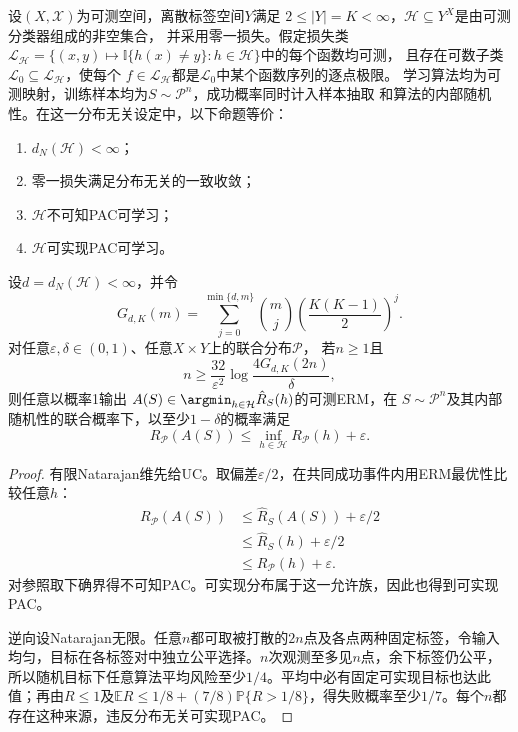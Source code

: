 \begin{theorem}[有限标签的可学习性刻画]
\label{thm:finite-label-learnability}
设$(X,\mathcal X)$为可测空间，离散标签空间$Y$满足
$2\leq|Y|=K<\infty$，$\mathcal H\subseteq Y^X$是由可测分类器组成的非空集合，
并采用零一损失。假定损失类
$\mathcal L_{\mathcal H}
=\{(x,y)\mapsto\mathbb I\{h(x)\neq y\}:h\in\mathcal H\}$中的每个函数均可测，
且存在可数子类$\mathcal L_0\subseteq\mathcal L_{\mathcal H}$，使每个
$f\in\mathcal L_{\mathcal H}$都是$\mathcal L_0$中某个函数序列的逐点极限。
学习算法均为可测映射，训练样本均为$S\sim\mathcal P^n$，成功概率同时计入样本抽取
和算法的内部随机性。在这一分布无关设定中，以下命题等价：
\begin{enumerate}
 \item $d_N(\mathcal H)<\infty$；
 \item 零一损失满足分布无关的一致收敛；
 \item $\mathcal H$不可知PAC可学习；
 \item $\mathcal H$可实现PAC可学习。
\end{enumerate}

设$d=d_N(\mathcal H)<\infty$，并令
\[
 G_{d,K}(m)=\sum_{j=0}^{\min\{d,m\}}\binom mj
 \left(\frac{K(K-1)}2\right)^j.
\]
对任意$\varepsilon,\delta\in(0,1)$、任意$X\times Y$上的联合分布$\mathcal P$，
若$n\geq1$且
\[
 n\geq\frac{32}{\varepsilon^2}\log\frac{4G_{d,K}(2n)}{\delta},
\]
则任意以概率1输出
$A(S)\in\argmin_{h\in\mathcal H}\hat R_S(h)$的可测ERM，在
$S\sim\mathcal P^n$及其内部随机性的联合概率下，以至少$1-\delta$的概率满足
\[
 R_{\mathcal P}(A(S))\leq\inf_{h\in\mathcal H}R_{\mathcal P}(h)+\varepsilon.
\]
\end{theorem}

\begin{proof}
有限Natarajan维先给UC。取偏差$\varepsilon/2$，在共同成功事件内用ERM最优性比较任意$h$：
\begin{align*}
 R_{\mathcal P}(A(S))&\leq\hat R_S(A(S))+\varepsilon/2\\
 &\leq\hat R_S(h)+\varepsilon/2\\
 &\leq R_{\mathcal P}(h)+\varepsilon.
\end{align*}
对参照取下确界得不可知PAC。可实现分布属于这一允许族，因此也得到可实现PAC。

逆向设Natarajan无限。任意$n$都可取被打散的$2n$点及各点两种固定标签，令输入均匀，目标在各标签对中独立公平选择。$n$次观测至多见$n$点，余下标签仍公平，所以随机目标下任意算法平均风险至少$1/4$。平均中必有固定可实现目标也达此值；再由$R\leq1$及$\mathbb E R\leq1/8+(7/8)\mathbb P\{R>1/8\}$，得失败概率至少$1/7$。每个$n$都存在这种来源，违反分布无关可实现PAC。
\end{proof}

